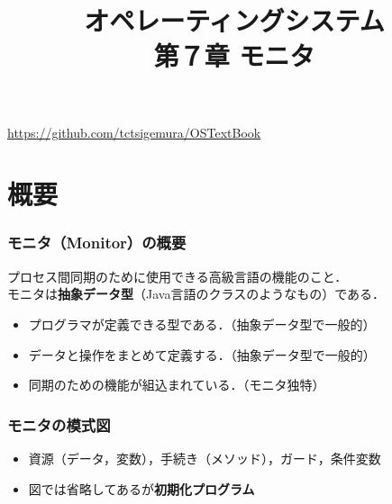 \documentclass[unicode,handout]{beamer}                   %
\begin{document}
\title[モニタ]
      {オペレーティングシステム\\第７章 モニタ}
\date{}
\begin{frame}
  \titlepage
  \centerline{\url{https://github.com/tctsigemura/OSTextBook}}
\end{frame}


\section{概要}
\begin{frame}
  \frametitle{モニタ（Monitor）の概要}

プロセス間同期のために使用できる高級言語の機能のこと．\\
モニタは{\bf 抽象データ型}（Java言語のクラスのようなもの）である．

\begin{itemize}
\item プログラマが定義できる型である．（抽象データ型で一般的）
\item データと操作をまとめて定義する．（抽象データ型で一般的）
\item 同期のための機能が組込まれている．（モニタ独特）
\end{itemize}
\end{frame}

\begin{frame}
  \frametitle{モニタの模式図}
  \begin{itemize}
  \item 資源（データ，変数），手続き（メソッド），ガード，条件変数
  \item 図では省略してあるが{\bf 初期化プログラム}
  \end{itemize}
\end{frame}

\end{document}
